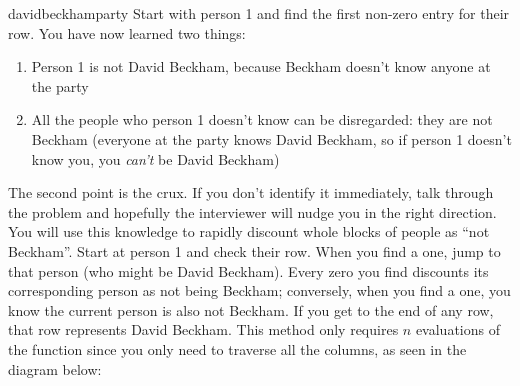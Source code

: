 \begin{answer}{davidbeckhamparty}
Start with person 1 and find the first non-zero entry for their row.
You have now learned two things:
\begin{enumerate}
  \item Person 1 is not David Beckham, because Beckham doesn't know anyone at the party
  \item All the people who person 1 doesn't know can be disregarded: they are not Beckham (everyone at the party knows David Beckham, so if person 1 doesn't know you, you \emph{can't} be David Beckham)
\end{enumerate}
The second point is the crux.
If you don't identify it immediately, talk through the problem and hopefully the interviewer will nudge you in the right direction.
You will use this knowledge to rapidly discount whole blocks of people as ``not Beckham''.
Start at person 1 and check their row.
When you find a one, jump to that person (who might be David Beckham).
Every zero you find discounts its corresponding person as not being Beckham; conversely, when you find a one, you know the current person is also not Beckham.
If you get to the end of any row, that row represents David Beckham.
This method only requires $n$ evaluations of the function since you only need to traverse all the columns, as seen in the diagram below:

\begin{center}
\end{center}
\end{answer}
